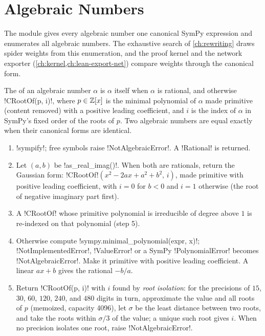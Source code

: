 \section{Algebraic Numbers}\label{sec:algebra-algebraic}

The module  gives every algebraic number one canonical SymPy expression and enumerates all algebraic numbers. The exhaustive search of \cref{ch:rewriting} draws spider weights from this enumeration, and the proof kernel and the network exporter (\cref{ch:kernel,ch:lean-export-net}) compare weights through the canonical form.

\begin{definition}\label{def:algebra-algebraic-canon}
The  of an algebraic number $\alpha$ is $\alpha$ itself when $\alpha$ is rational, and otherwise \py!CRootOf(p, i)!, where $p\in\mathbb{Z}[x]$ is the minimal polynomial of $\alpha$ made primitive (content removed) with a positive leading coefficient, and $i$ is the index of $\alpha$ in SymPy's fixed order of the roots of $p$. Two algebraic numbers are equal exactly when their canonical forms are identical.
\end{definition}

\begin{algorithm}\label{alg:algebra-canonical-algebraic}
\begin{enumerate}
\item \py!sympify!; free symbols raise \py!NotAlgebraicError!. A \py!Rational! is returned.
\item Let $(a,b)$ be \py!as_real_imag()!. When both are rationals, return the Gaussian form: \py!CRootOf!$(x^2-2ax+a^2+b^2,\,i)$, made primitive with positive leading coefficient, with $i=0$ for $b<0$ and $i=1$ otherwise (the root of negative imaginary part first).
\item A \py!CRootOf! whose primitive polynomial is irreducible of degree above $1$ is re-indexed on that polynomial (step 5).
\item Otherwise compute \py!sympy.minimal_polynomial(expr, x)!; \py!NotImplementedError!, \py!ValueError! or a SymPy \py!PolynomialError! becomes \py!NotAlgebraicError!. Make it primitive with positive leading coefficient. A linear $ax+b$ gives the rational $-b/a$.
\item Return \py!CRootOf(p, i)! with $i$ found by \emph{root isolation}: for the precisions of $15$, $30$, $60$, $120$, $240$, and $480$ digits in turn, approximate the value and all roots of $p$ (memoized, capacity 4096), let $\sigma$ be the least distance between two roots, and take the roots within $\sigma/3$ of the value; a unique such root gives $i$. When no precision isolates one root, raise \py!NotAlgebraicError!.
\end{enumerate}
\end{algorithm}

